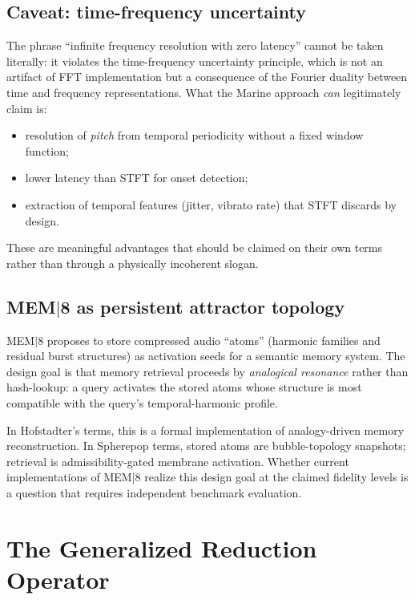 \documentclass[12pt, a4paper]{article}
\theoremstyle{plain}
\theoremstyle{definition}
\theoremstyle{remark}
\begin{document}
\subsection{Caveat: time-frequency uncertainty}
\label{sec:marine-caveat}

The phrase ``infinite frequency resolution with zero latency'' cannot
be taken literally: it violates the time-frequency uncertainty
principle, which is not an artifact of FFT implementation but a
consequence of the Fourier duality between time and frequency
representations.
What the Marine approach \emph{can} legitimately claim is:
\begin{itemize}
  \item resolution of \emph{pitch} from temporal periodicity without
        a fixed window function;
  \item lower latency than STFT for onset detection;
  \item extraction of temporal features (jitter, vibrato rate) that
        STFT discards by design.
\end{itemize}
These are meaningful advantages that should be claimed on their own
terms rather than through a physically incoherent slogan.

\subsection{MEM$|$8 as persistent attractor topology}

MEM$|$8 proposes to store compressed audio ``atoms'' (harmonic families
and residual burst structures) as activation seeds for a semantic
memory system.
The design goal is that memory retrieval proceeds by \emph{analogical
resonance} rather than hash-lookup: a query activates the stored atoms
whose structure is most compatible with the query's temporal-harmonic profile.

In Hofstadter's terms, this is a formal implementation of
analogy-driven memory reconstruction.
In Spherepop terms, stored atoms are bubble-topology snapshots;
retrieval is admissibility-gated membrane activation.
Whether current implementations of MEM$|$8 realize this design goal
at the claimed fidelity levels is a question that requires
independent benchmark evaluation.

\section{The Generalized Reduction Operator}
\label{sec:unification}
\end{document}
